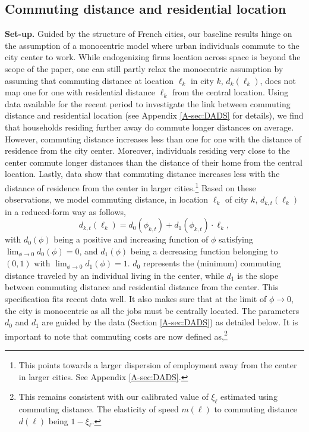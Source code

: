 \documentclass[11pt]{report}
\begin{document}
\newpage



\subsection{Commuting distance and residential location}\label{B-sec:d1d2}

\textbf{Set-up.} Guided by the structure of French cities, our baseline results hinge on the assumption of a monocentric model where urban individuals commute to the city center to work. While endogenizing firms location across space is beyond the scope of the paper, one can still partly relax the monocentric assumption by assuming that commuting distance at location $\ell_k$ in city $k$, $d_k(\ell_k)$, does not map one for one with residential distance $\ell_k$ from the central location. Using data available for the recent period to investigate the link between commuting distance and residential location (see Appendix \ref{A-sec:DADS} for details), we find that households residing further away do commute longer distances on average. However, commuting distance increases less than one for one with the distance of residence from the city center. Moreover, individuals residing very close to the center commute longer distances than the distance of their home from the central location. Lastly, data show that commuting distance increases less with the distance of residence from the center in larger cities.\footnote{This points towards a larger dispersion of employment away from the center in larger cities. See Appendix \ref{A-sec:DADS}.} Based on these observations, we model commuting distance, in location $\ell_k$ of city $k$, $d_{k,t}(\ell_k)$ in a reduced-form way as follows,
\begin{equation}
d_{k,t}(\ell_k)=d_0(\phi_{k,t})+d_1(\phi_{k,t})\cdot\ell_k, \label{B-eq:commdistanceextension}
\end{equation}
with $d_0(\phi)$ being a positive and increasing function of $\phi$ satisfying $\lim_{\phi \rightarrow 0} d_0(\phi)=0$, and $d_1(\phi)$ being a decreasing function belonging to $(0,1)$ with $\lim_{\phi \rightarrow 0} d_1(\phi)=1$. $d_0$ represents the (minimum) commuting distance traveled by an individual living in the center, while $d_1$ is the slope between commuting distance and residential distance from the center. This specification fits recent data well. It also makes sure that at the limit of $\phi \rightarrow 0$, the city is monocentric as all the jobs must be centrally located. The parameters $d_0$ and $d_1$ are guided by the data (Section \ref{A-sec:DADS}) as detailed below. It is important to note that commuting costs are now defined as,\footnote{This remains consistent with our calibrated value of $\xi_\ell$ estimated using commuting distance. The elasticity of speed $m(\ell)$ to commuting distance $d(\ell)$ being $1-\xi_\ell$.}
\end{document}
